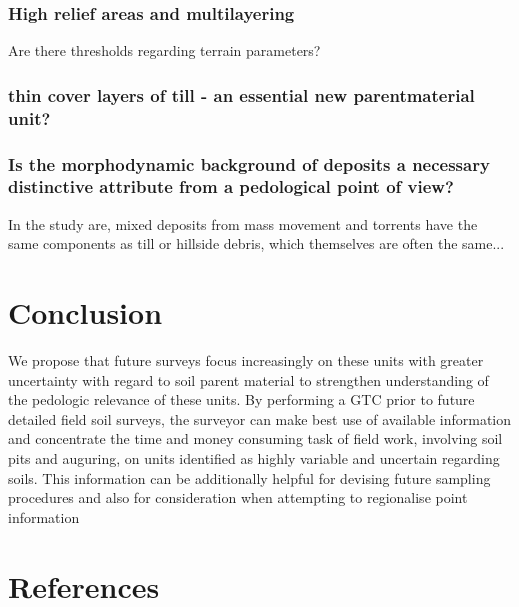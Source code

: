 \documentclass[preprint,12pt,authoryear]{elsarticle}
\begin{document}
\subsubsection{High relief areas and multilayering}
Are there thresholds regarding terrain parameters?
\subsubsection{thin cover layers of till - an essential new parentmaterial unit?}

\subsubsection{Is the morphodynamic background of deposits a necessary distinctive attribute from a pedological point of view?}
In the study are, mixed deposits from mass movement and torrents have the same components as till or hillside debris, which themselves are often the same...

\section{Conclusion}
We propose that future surveys focus increasingly on these units with greater uncertainty with regard to soil parent material to strengthen understanding of the pedologic relevance of these units. By performing a GTC prior to future detailed field soil surveys, the surveyor can make best use of available information and concentrate the time and money consuming task of field work, involving soil pits and auguring, on units identified as highly variable and uncertain regarding soils. This information can be additionally helpful for devising future sampling procedures and also for consideration when attempting to regionalise point information

\section*{References}

\end{document}
